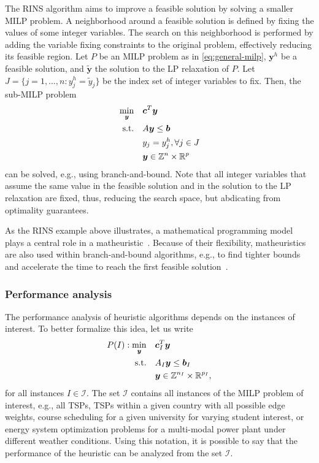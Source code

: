 The RINS algorithm aims to improve a feasible solution by solving a smaller MILP problem. 
A neighborhood around a feasible solution is defined by fixing the values of some integer variables.
The search on this neighborhood is performed by adding the variable fixing constraints to the original problem, effectively reducing its feasible region.
Let $P$ be an MILP problem as in \eqref{eq:general-milp}, $\bm{y}^{h}$ be a feasible solution, and $\widetilde{\bm{y}}$ the solution to the LP relaxation of $P$.
Let $J = \{j = 1,\ldots,n : y_j^{h} = \widetilde{y}_j\}$ be the index set of integer variables to fix.
Then, the sub-MILP problem
\begin{align*}
    \min_{\bm{y}} \quad & \bm{c}^{T}\bm{y} \\
    \textrm{s.t.} \quad & A\bm{y}\le \bm{b} \\
      & y_j = y_j^{h}, \forall j \in J \\
      & \bm{y}\in \mathbb{Z}^{n}\times \mathbb{R}^{p}
\end{align*}
can be solved, e.g., using branch-and-bound.
Note that all integer variables that assume the same value in the feasible solution and in the solution to the LP relaxation are fixed, thus, reducing the search space, but abdicating from optimality guarantees.

As the RINS example above illustrates, a mathematical programming model plays a central role in a matheuristic~\cite{fischettiMatheuristics2016}.
Because of their flexibility, matheuristics are also used within branch-and-bound algorithms, e.g., to find tighter bounds and accelerate the time to reach the first feasible solution~\cite{fischettiMatheuristics2016,maniezzoMatheuristicsAlgorithmsImplementations2021}.

\subsubsection{Performance analysis}

The performance analysis of heuristic algorithms depends on the instances of interest.
To better formalize this idea, let us write
\begin{align*}
    P(I): \min_{\bm{y}} \quad & \bm{c}_I^{T}\bm{y} \\
    \textrm{s.t.} \quad & A_I\bm{y} \le \bm{b}_I \\
      & \bm{y}\in \mathbb{Z}^{n_I}\times \mathbb{R}^{p_I}
,\end{align*}
for all instances $I\in \mathcal{I}$.
The set $\mathcal{I}$ contains all instances of the MILP problem of interest, e.g., all TSPs, TSPs within a given country with all possible edge weights, course scheduling for a given university for varying student interest, or energy system optimization problems for a multi-modal power plant under different weather conditions.
Using this notation, it is possible to say that the performance of the heuristic can be analyzed from the set $\mathcal{I}$.

